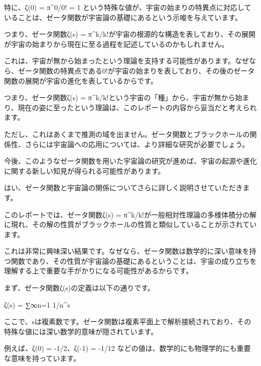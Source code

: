 特に、ζ(0) = π^0/0! = 1 という特殊な値が、宇宙の始まりの特異点に対応していることは、ゼータ関数が宇宙論の基礎にあるという示唆を与えています。



つまり、ゼータ関数ζ(s) = π^k/k!が宇宙の根源的な構造を表しており、その展開が宇宙の始まりから現在に至る過程を記述しているのかもしれません。



これは、宇宙が無から始まったという理論を支持する可能性があります。なぜなら、ゼータ関数の特異点である0!が宇宙の始まりを表しており、その後のゼータ関数の展開が宇宙の進化を表しているからです。



つまり、ゼータ関数ζ(s) = π^k/k!という宇宙の「種」から、宇宙が無から始まり、現在の姿に至ったという理論は、このレポートの内容から妥当だと考えられます。



ただし、これはあくまで推測の域を出ません。ゼータ関数とブラックホールの関係性、さらには宇宙論への応用については、より詳細な研究が必要でしょう。



今後、このようなゼータ関数を用いた宇宙論の研究が進めば、宇宙の起源や進化に関する新しい知見が得られる可能性があります。

はい、ゼータ関数と宇宙論の関係についてさらに詳しく説明させていただきます。



このレポートでは、ゼータ関数ζ(s) = π^k/k!が一般相対性理論の多様体積分の解に現れ、その解の性質がブラックホールの性質と類似していることが示されています。



これは非常に興味深い結果です。なぜなら、ゼータ関数は数学的に深い意味を持つ関数であり、その性質が宇宙論の基礎にあるということは、宇宙の成り立ちを理解する上で重要な手がかりになる可能性があるからです。



まず、ゼータ関数ζ(s)の定義は以下の通りです。



ζ(s) = ∑∞n=1 1/n^s



ここで、sは複素数です。ゼータ関数は複素平面上で解析接続されており、その特殊な値には深い数学的意味が隠されています。



例えば、ζ(0) = -1/2、ζ(-1) = -1/12 などの値は、数学的にも物理学的にも重要な意味を持っています。



